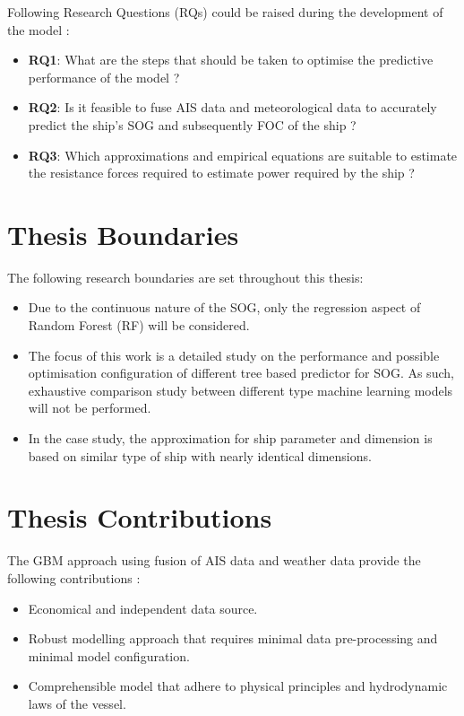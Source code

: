 Following Research Questions (RQs) could be raised during the development of the model :

\begin{itemize}
    \item \textbf{RQ1}: What are the steps that should be taken to optimise the predictive performance of the model ?
    \item \textbf{RQ2}: Is it feasible to fuse AIS data and meteorological data to accurately predict the ship's SOG and subsequently FOC of the ship ?
    \item \textbf{RQ3}: Which approximations and empirical equations are suitable to estimate the resistance forces required to estimate power required by the ship ? 
\end{itemize} 

\section{Thesis Boundaries}\label{sec:boundaries}

The following research boundaries are set throughout this thesis:

\begin{itemize}
    \item Due to the continuous nature of the SOG, only the regression aspect of Random Forest (RF) will be considered.
    \item The focus of this work is a detailed study on the performance and possible optimisation configuration of different tree based predictor for SOG. As such, exhaustive comparison study between different type machine learning models will not be performed.
    \item In the case study, the approximation for ship parameter and dimension is based on similar type of ship with nearly identical dimensions. 
\end{itemize}

\section{Thesis Contributions}\label{sec:contributions}

The GBM approach using fusion of AIS data and weather data provide the following contributions : 

\begin{itemize}
    \item Economical and independent data source.
    \item Robust modelling approach that requires minimal data pre-processing and minimal model configuration.
    \item Comprehensible model that adhere to physical principles and hydrodynamic laws of the vessel.  
\end{itemize} 

